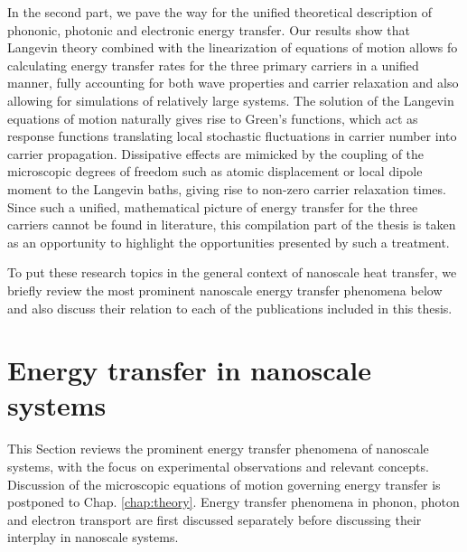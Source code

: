 In the second part, we pave the way for the unified theoretical description of phononic, photonic and electronic energy transfer. Our results show that Langevin theory \cite{langevin,zwanzig} combined with the linearization of equations of motion allows fo calculating energy transfer rates for the three primary carriers in a unified manner, fully accounting for both wave properties and carrier relaxation and also allowing for simulations of relatively large systems. The solution of the Langevin equations of motion naturally gives rise to Green's functions, which act as response functions translating local stochastic fluctuations in carrier number into carrier propagation. Dissipative effects are mimicked by the coupling of the microscopic degrees of freedom such as atomic displacement or local dipole moment to the Langevin baths, giving rise to non-zero carrier relaxation times. Since such a unified, mathematical picture of energy transfer for the three carriers cannot be found in literature, this compilation part of the thesis is taken as an opportunity to highlight the opportunities presented by such a treatment.

To put these research topics in the general context of nanoscale heat transfer, we briefly review the most prominent nanoscale energy transfer phenomena below and also discuss their relation to each of the publications included in this thesis. 




\section{Energy transfer in nanoscale systems}
This Section reviews the prominent energy transfer phenomena of nanoscale systems, with the focus on experimental observations and relevant concepts. Discussion of the microscopic equations of motion governing energy transfer is postponed to Chap. \ref{chap:theory}. Energy transfer phenomena in phonon, photon and electron transport are first discussed separately before discussing their interplay in nanoscale systems.

